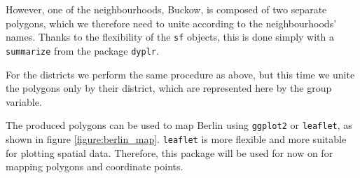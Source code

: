 

However, one of the neighbourhoods, Buckow, is composed of two separate polygons, which we therefore need to unite according to the neighbourhoods' names. Thanks to the flexibility of the \texttt{sf} objects, this is done simply with a \texttt{summarize} from the package \texttt{dyplr}.



For the districts we perform the same procedure as above, but this time we unite the polygons only by their district, which are represented here by the group variable.



The produced polygons can be used to map Berlin using \texttt{ggplot2} or \texttt{leaflet}, as shown in figure \ref{figure:berlin_map}. \texttt{leaflet} is more flexible and more suitable for plotting spatial data. Therefore, this package will be used for now on for mapping polygons and coordinate points.


